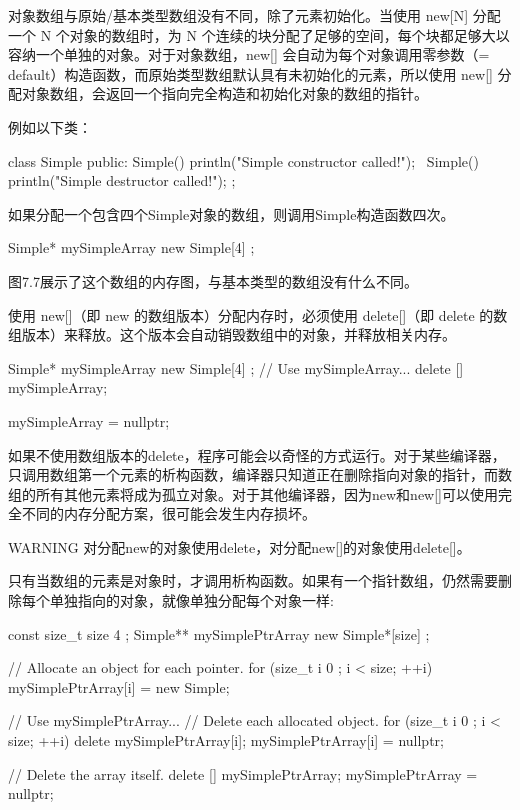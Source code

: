 
对象数组与原始/基本类型数组没有不同，除了元素初始化。当使用 new[N] 分配一个 N 个对象的数组时，为 N 个连续的块分配了足够的空间，每个块都足够大以容纳一个单独的对象。对于对象数组，new[] 会自动为每个对象调用零参数（= default）构造函数，而原始类型数组默认具有未初始化的元素，所以使用 new[] 分配对象数组，会返回一个指向完全构造和初始化对象的数组的指针。

例如以下类：

\begin{cpp}
class Simple
{
    public:
        Simple() { println("Simple constructor called!"); }
        ~Simple() { println("Simple destructor called!"); }
};
\end{cpp}

如果分配一个包含四个Simple对象的数组，则调用Simple构造函数四次。

\begin{cpp}
Simple* mySimpleArray { new Simple[4] };
\end{cpp}

图7.7展示了这个数组的内存图，与基本类型的数组没有什么不同。



使用 new[]（即 new 的数组版本）分配内存时，必须使用 delete[]（即 delete 的数组版本）来释放。这个版本会自动销毁数组中的对象，并释放相关内存。

\begin{cpp}
Simple* mySimpleArray { new Simple[4] };
// Use mySimpleArray...
delete [] mySimpleArray;

mySimpleArray = nullptr;
\end{cpp}

如果不使用数组版本的delete，程序可能会以奇怪的方式运行。对于某些编译器，只调用数组第一个元素的析构函数，编译器只知道正在删除指向对象的指针，而数组的所有其他元素将成为孤立对象。对于其他编译器，因为new和new[]可以使用完全不同的内存分配方案，很可能会发生内存损坏。

\begin{myWarning}{WARNING}
对分配new的对象使用delete，对分配new[]的对象使用delete[]。
\end{myWarning}

只有当数组的元素是对象时，才调用析构函数。如果有一个指针数组，仍然需要删除每个单独指向的对象，就像单独分配每个对象一样:

\begin{cpp}
const size_t size { 4 };
Simple** mySimplePtrArray { new Simple*[size] };

// Allocate an object for each pointer.
for (size_t i { 0 }; i < size; ++i) { mySimplePtrArray[i] = new Simple{}; }

// Use mySimplePtrArray...
// Delete each allocated object.
for (size_t i { 0 }; i < size; ++i) {
    delete mySimplePtrArray[i];
    mySimplePtrArray[i] = nullptr;
}

// Delete the array itself.
delete [] mySimplePtrArray;
mySimplePtrArray = nullptr;
\end{cpp}

